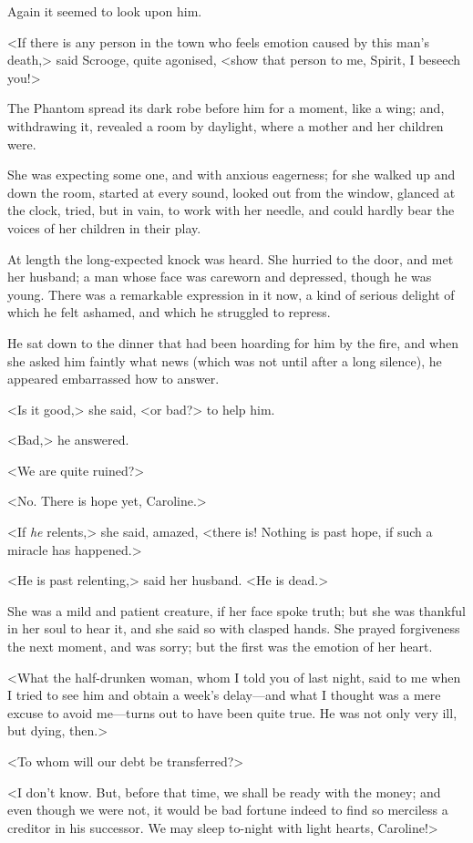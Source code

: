 Again it seemed to look upon him.

<If there is any person in the town who feels emotion caused by this man's death,> said Scrooge, quite agonised, <show that person to me, Spirit, I beseech you!>

The Phantom spread its dark robe before him for a moment, like a wing; and, withdrawing it, revealed a room by daylight, where a mother and her children were.

She was expecting some one, and with anxious eagerness; for she walked up and down the room, started at every sound, looked out from the window, glanced at the clock, tried, but in vain, to work with her needle, and could hardly bear the voices of her children in their play.

At length the long-expected knock was heard. She hurried to the door, and met her husband; a man whose face was careworn and depressed, though he was young. There was a remarkable expression in it now, a kind of serious delight of which he felt ashamed, and which he struggled to repress.

He sat down to the dinner that had been hoarding for him by the fire, and when she asked him faintly what news (which was not until after a long silence), he appeared embarrassed how to answer.

<Is it good,> she said, <or bad?> to help him.

<Bad,> he answered.

<We are quite ruined?>

<No. There is hope yet, Caroline.>

<If \textit{he} relents,> she said, amazed, <there is! Nothing is past hope, if such a miracle has happened.>

<He is past relenting,> said her husband. <He is dead.>

She was a mild and patient creature, if her face spoke truth; but she was thankful in her soul to hear it, and she said so with clasped hands. She prayed forgiveness the next moment, and was sorry; but the first was the emotion of her heart.

<What the half-drunken woman, whom I told you of last night, said to me when I tried to see him and obtain a week's delay—and what I thought was a mere excuse to avoid me—turns out to have been quite true. He was not only very ill, but dying, then.>

<To whom will our debt be transferred?>

<I don't know. But, before that time, we shall be ready with the money; and even though we were not, it would be bad fortune indeed to find so merciless a creditor in his successor. We may sleep to-night with light hearts, Caroline!>

